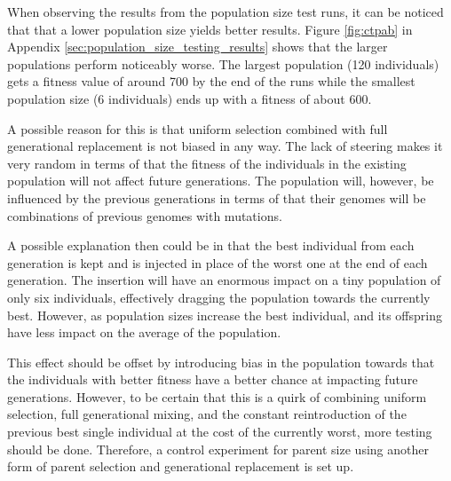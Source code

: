 When observing the results from the population size test runs, it can be noticed that that a lower population size yields better results. Figure \ref{fig:ctpab} in Appendix \ref{sec:population_size_testing_results} shows that the larger populations perform noticeably worse. The largest population (120 individuals) gets a fitness value of around 700 by the end of the runs while the smallest population size (6 individuals) ends up with a fitness of about 600.

A possible reason for this is that uniform selection combined with full generational replacement is not biased in any way. The lack of steering makes it very random in terms of that the fitness of the individuals in the existing population will not affect future generations. The population will, however, be influenced by the previous generations in terms of that their genomes will be combinations of previous genomes with mutations.

A possible explanation then could be in that the best individual from each generation is kept and is injected in place of the worst one at the end of each generation. The insertion will have an enormous impact on a tiny population of only six individuals, effectively dragging the population towards the currently best. However, as population sizes increase the best individual, and its offspring have less impact on the average of the population.

This effect should be offset by introducing bias in the population towards that the individuals with better fitness have a better chance at impacting future generations. However, to be certain that this is a quirk of combining uniform selection, full generational mixing, and the constant reintroduction of the previous best single individual at the cost of the currently worst, more testing should be done. Therefore, a control experiment for parent size using another form of parent selection and generational replacement is set up.



